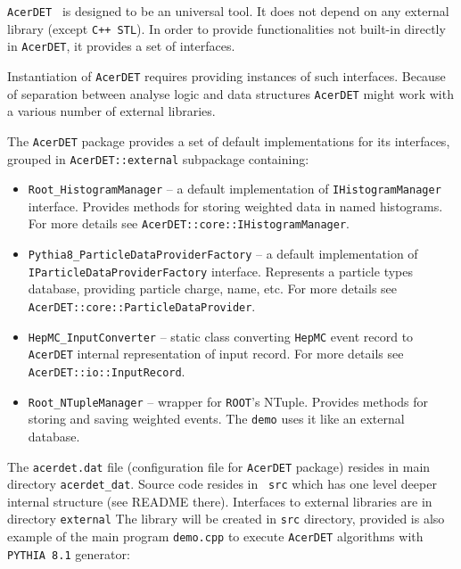 {\tt AcerDET } is designed to be an universal tool. It does not depend on any external 
library (except {\tt C++ STL}). In order to provide functionalities not built-in directly 
in {\tt AcerDET}, it provides a set of interfaces.

Instantiation of {\tt AcerDET} requires providing instances of such interfaces. Because of 
separation between analyse logic and data structures {\tt AcerDET} might work with a various 
number of external libraries.

The {\tt AcerDET} package provides a set of default implementations for its interfaces, 
grouped in {\tt AcerDET::external} subpackage containing:
\begin{itemize}

\item {\tt Root\_HistogramManager} -- a default implementation of {\tt IHistogramManager} 
interface. Provides methods for storing weighted data in named histograms. 
For more details see {\tt AcerDET::core::IHistogramManager}.

\item {\tt Pythia8\_ParticleDataProviderFactory} -- a default implementation of 
{\tt IParticleDataProviderFactory} interface. Represents a particle types database, 
providing particle charge, name, etc. For more details see {\tt AcerDET::core::ParticleDataProvider}.

\item {\tt HepMC\_InputConverter} -- static class converting {\tt HepMC} event record 
to {\tt AcerDET} internal representation of input record. For more details see 
{\tt AcerDET::io::InputRecord}.

\item {\tt Root\_NTupleManager} -- wrapper for {\tt ROOT}'s NTuple. Provides methods for 
storing and saving weighted events. The {\tt demo} uses it like an external database.

\end{itemize}

The {\tt acerdet.dat} file (configuration file for {\tt AcerDET} package) resides in
main directory {\tt acerdet\_dat}. Source code resides in {\tt
src} which has one level deeper internal structure (see README there). 
Interfaces to external libraries are in directory {\tt external}
The library will be created in {\tt src} directory, provided is also
example of the main program {\tt  demo.cpp} to execute {\tt AcerDET} algorithms
with  {\tt PYTHIA 8.1} generator:

